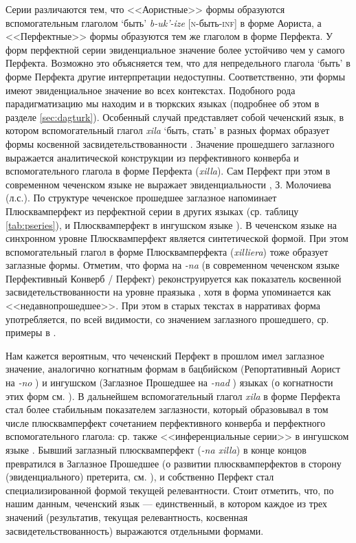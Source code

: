 Серии различаются тем, что <<Аористные>> формы образуются вспомогательным глаголом `быть' \textit{b-uk’-ize} [\textsc{n}-быть-\textsc{inf}] в форме Аориста, а <<Перфектные>> формы образуются тем же глаголом в форме Перфекта. У форм перфектной серии эвиденциальное значение более устойчиво чем у самого Перфекта. Возможно это объясняется тем, что для непредельного глагола `быть' в форме Перфекта другие интерпретации недоступны. Соответственно, эти формы имеют  эвиденциальное значение во всех контекстах. Подобного рода парадигматизацию мы находим и в тюркских языках (подробнее об этом в разделе \ref{sec:dagturk}). Особенный случай представляет собой чеченский язык, в котором вспомогательный глагол \textit{xila} `быть, стать' в разных формах образует формы косвенной засвидетельствованности \citep{molochieva2007}. Значение прошедшего заглазного выражается аналитической конструкции из перфективного конверба и вспомогательного глагола в форме Перфекта (\textit{xilla}). Сам Перфект при этом в современном чеченском языке не выражает эвиденциальности \citep{molochieva2010}, З. Молочиева (л.с.). По структуре чеченское прошедшее заглазное напоминает Плюсквамперфект из перфектной серии в других языках (ср. таблицу \ref{tab:pseries}), и Плюсквамперфект в ингушском языке \citep[257]{nichols2011}). В чеченском языке на синхронном уровне Плюсквамперфект является синтетической формой. При этом вспомогательный глагол в форме Плюсквамперфекта (\textit{xilliera}) тоже образует заглазные формы. Отметим, что форма на \textit{-na} (в современном чеченском языке Перфективный Конверб / Перфект) реконструируется как показатель косвенной засвидетельствованности на уровне праязыка \citep{imnaishvili1954}, хотя в \citep[484--485]{desheriev1963} форма упоминается как <<недавнопрошедшее>>. При этом в старых текстах в нарративах форма употребляется, по всей видимости, со значением заглазного прошедшего, ср. примеры в \citep{nichols1981}.
\par Нам кажется вероятным, что чеченский Перфект в прошлом имел заглазное значение, аналогично когнатным формам в бацбийском (Репортативный Аорист на \textit{-no} \citep{holiskygagua1994}) и ингушском (Заглазное Прошедшее на \textit{-nad} \citep{nichols2011}) языках (о когнатности этих форм см. \citep{desheriev1963}). В дальнейшем вспомогательный глагол \textit{xila} в форме Перфекта стал более стабильным показателем заглазности, который образовывал в том числе плюсквамперфект сочетанием перфективного конверба и перфектного вспомогательного глагола: ср. также <<инференциальные серии>> в ингушском языке \citep[254--261]{nichols2011}. Бывший заглазный плюсквамперфект (\textit{-na xilla}) в конце концов превратился в Заглазное Прошедшее (о развитии плюсквамперфектов в сторону (эвиденциального) претерита, см. \citep[43, 154--158]{sichinava2013}), и собственно Перфект стал специализированной формой текущей релевантности. Стоит отметить, что, по нашим данным, чеченский язык --- единственный, в котором каждое из трех значений (результатив, текущая релевантность, косвенная засвидетельствованность) выражаются отдельными формами.
